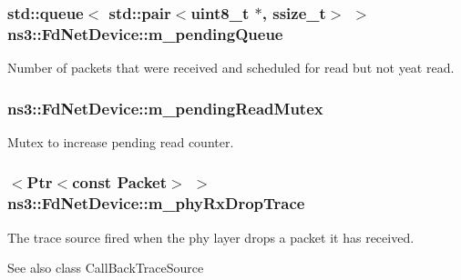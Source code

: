 \subsubsection[{\texorpdfstring{m\+\_\+pending\+Queue}{m_pendingQueue}}]{\setlength{\rightskip}{0pt plus 5cm}std\+::queue$<$ std\+::pair$<$uint8\+\_\+t $\ast$, ssize\+\_\+t$>$ $>$ ns3\+::\+Fd\+Net\+Device\+::m\+\_\+pending\+Queue\hspace{0.3cm}{\ttfamily [private]}}\hypertarget{classns3_1_1FdNetDevice_a58492550a84c8c2c959b4d4904342d70}{}\label{classns3_1_1FdNetDevice_a58492550a84c8c2c959b4d4904342d70}
Number of packets that were received and scheduled for read but not yeat read. 
\subsubsection[{\texorpdfstring{m\+\_\+pending\+Read\+Mutex}{m_pendingReadMutex}}]{ ns3\+::\+Fd\+Net\+Device\+::m\+\_\+pending\+Read\+Mutex\hspace{0.3cm}{\ttfamily [private]}}\hypertarget{classns3_1_1FdNetDevice_a957f57e977ee857a0233a484c276d427}{}\label{classns3_1_1FdNetDevice_a957f57e977ee857a0233a484c276d427}
Mutex to increase pending read counter. 
\subsubsection[{\texorpdfstring{m\+\_\+phy\+Rx\+Drop\+Trace}{m_phyRxDropTrace}}]{$<${\bf Ptr}$<$const {\bf Packet}$>$ $>$ ns3\+::\+Fd\+Net\+Device\+::m\+\_\+phy\+Rx\+Drop\+Trace\hspace{0.3cm}{\ttfamily [private]}}\hypertarget{classns3_1_1FdNetDevice_ab0049e3c36f1916a8b15de5446ce192c}{}\label{classns3_1_1FdNetDevice_ab0049e3c36f1916a8b15de5446ce192c}
The trace source fired when the phy layer drops a packet it has received.

\begin{DoxySeeAlso}{See also}
class Call\+Back\+Trace\+Source 
\end{DoxySeeAlso}
